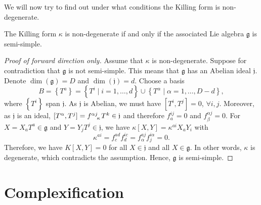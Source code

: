 We will now try to find out under what conditions the Killing form is non-degenerate.
\begin{theorem}[by Cartan]
  The Killing form $\kappa$ is non-degenerate if and only if the associated Lie algebra $\mathfrak{g}$ is semi-simple.
\end{theorem}
\begin{proof}[Proof of forward direction only]
  Assume that $\kappa$ is non-degenerate.
  Suppose for contradiction that $\mathfrak{g}$ is not semi-simple.
  This means that $\mathfrak{g}$ has an Abelian ideal $\mathfrak{j}$.
  Denote $\dim(\mathfrak{g}) = D$ and $\dim(\mathfrak{j}) = d$.
  Choose a basis
  \begin{equation}
    B = \left\{ T^{a} \right\} = \left\{ T^{i} \mid i = 1, \dots, d \right\} \cup \left\{ T^{\alpha} \mid \alpha =1, \dots, D-d \right\},
  \end{equation}
  where $\left\{ T^{i} \right\}$ span $\mathfrak{j}$. As $\mathfrak{j}$ is Abelian, we must have $[T^{i}, T^{j}] = 0$, $\forall i, j$.
  Moreover, as $\mathfrak{j}$ is an ideal, $[T^{\alpha}, T^{j}] = f \indices{^{\alpha j}_{\kappa}} T^{k} \in \mathfrak{j}$ and therefore $f^{ij}_{a} = 0$ and $f^{\alpha j}_{\beta} =0$.
  For $X = X_{a} T^{a} \in \mathfrak{g}$ and $Y = Y_{j} T^{j} \in \mathfrak{j}$, we have $\kappa[X, Y] = \kappa^{ai} X_{a} Y_{i}$ with
  \begin{equation}
    \kappa^{ai} = f^{ad}_{c} f^{ic}_{d} = f^{aj}_{\alpha} f^{i\alpha}_{j} = 0.
  \end{equation}
  Therefore, we have $K[X, Y] = 0$ for all $X \in \mathfrak{j}$ and all $X \in \mathfrak{g}$. In other words, $\kappa$ is degenerate, which contradicts the assumption.
  Hence, $\mathfrak{g}$ is semi-simple.
\end{proof}

\section{Complexification}%
\label{sec:complexification}

